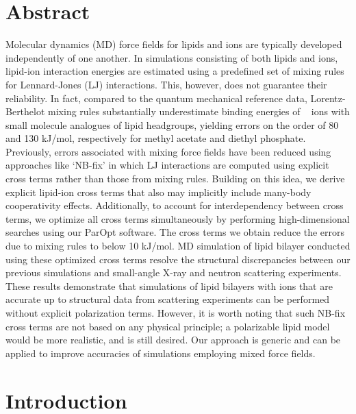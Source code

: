 \section{Abstract}
Molecular dynamics (MD) force fields for lipids and ions are typically developed independently of one another. 
In simulations consisting of both lipids and ions, 
lipid-ion interaction energies are estimated using a predefined 
set of mixing rules for Lennard-Jones (LJ) interactions. 
This, however, does not guarantee their reliability. 
In fact, compared to the quantum mechanical reference data, 
Lorentz-Berthelot mixing 
rules substantially underestimate binding energies of \na~ ions with small 
molecule analogues of lipid headgroups, yielding errors on the order of 80 and 130 kJ/mol, 
respectively for methyl acetate and diethyl phosphate. Previously, errors 
associated with mixing force fields have been reduced using approaches like `NB-fix' 
in which LJ interactions are computed using explicit cross terms rather than 
those from mixing rules. Building on this idea, we derive explicit 
lipid-ion cross terms that also may implicitly include many-body 
cooperativity effects.
Additionally, to account for interdependency between cross terms, 
we optimize all cross terms simultaneously by 
performing high-dimensional searches using our ParOpt software. 
The cross terms we obtain reduce the 
errors due to mixing rules to below 10 kJ/mol. 
MD simulation of lipid bilayer conducted using these 
optimized cross terms resolve the structural discrepancies between our previous 
simulations and small-angle X-ray and neutron scattering experiments. 
These results demonstrate that simulations of lipid bilayers with ions that are 
accurate up to structural data from scattering experiments 
can be performed without explicit polarization terms. 
However, it is worth noting that such NB-fix cross terms are
not based on any physical principle; a polarizable lipid model would be more 
realistic, and is still desired. 
Our approach is generic and can be applied to 
improve accuracies of simulations employing mixed force fields.


\section{Introduction}

